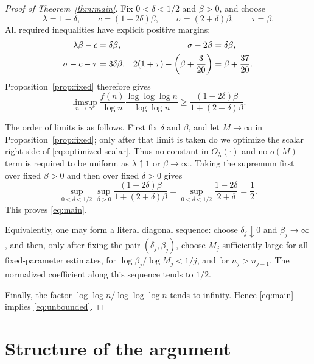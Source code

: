 \documentclass[11pt]{article}
\theoremstyle{remark}
\begin{document}
\begin{proof}[Proof of Theorem~\ref{thm:main}]
Fix \(0<\delta<1/2\) and \(\beta>0\), and choose
\begin{equation}\label{eq:optimized-parameters}
 \lambda=1-\delta,\qquad
 c=(1-2\delta)\beta,\qquad
 \sigma=(2+\delta)\beta,\qquad
 \tau=\beta.
\end{equation}
All required inequalities have explicit positive margins:
\begin{align}
 \lambda\beta-c&=\delta\beta,
 &\sigma-2\beta&=\delta\beta,\notag\\
 \sigma-c-\tau&=3\delta\beta,
 &2(1+\tau)-\left(\beta+\frac3{20}\right)
 &=\beta+\frac{37}{20}.
 \label{eq:parameter-margins}
\end{align}
Proposition~\ref{prop:fixed} therefore gives
\begin{equation}\label{eq:optimized-scalar}
 \limsup_{n\to\infty}
 \frac{f(n)}{\log n}
 \frac{\log\log\log n}{\log\log n}
 \geq
 \frac{(1-2\delta)\beta}{1+(2+\delta)\beta}.
\end{equation}

The order of limits is as follows.  First fix \(\delta\) and \(\beta\),
and let \(M\to\infty\) in Proposition~\ref{prop:fixed}; only after that
limit is taken do we optimize the scalar right side of
\eqref{eq:optimized-scalar}.  Thus no constant in
\(O_\lambda(\cdot)\) and no \(o(M)\) term is required to be uniform as
\(\lambda\uparrow1\) or \(\beta\to\infty\).  Taking the supremum first
over fixed \(\beta>0\) and then over fixed \(\delta>0\) gives
\[
 \sup_{0<\delta<1/2}\sup_{\beta>0}
 \frac{(1-2\delta)\beta}{1+(2+\delta)\beta}
 =\sup_{0<\delta<1/2}\frac{1-2\delta}{2+\delta}
 =\frac12.
\]
This proves \eqref{eq:main}.

Equivalently, one may form a literal diagonal sequence: choose
\(\delta_j\downarrow0\) and \(\beta_j\to\infty\), and then, only after
fixing the pair \((\delta_j,\beta_j)\), choose \(M_j\) sufficiently large
for all fixed-parameter estimates, for
\(\log\beta_j/\log M_j<1/j\), and for \(n_j>n_{j-1}\).  The normalized
coefficient along this sequence tends to \(1/2\).

Finally, the factor
\(\log\log n/\log\log\log n\) tends to infinity.  Hence
\eqref{eq:main} implies \eqref{eq:unbounded}.
\end{proof}

\section{Structure of the argument}
\end{document}
